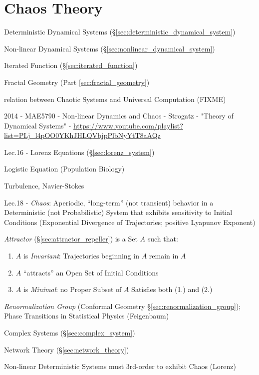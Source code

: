 \section{Chaos Theory}\label{sec:chaos_theory}

Deterministic Dynamical Systems (\S\ref{sec:deterministic_dynamical_system})

Non-linear Dynamical Systems (\S\ref{sec:nonlinear_dynamical_system})

Iterated Function (\S\ref{sec:iterated_function})

Fractal Geometry (Part \ref{sec:fractal_geometry})

relation between Chaotic Systems and Universal Computation (FIXME)

2014 - MAE5790 - Non-linear Dynamics and Chaos - Strogatz - "Theory of
Dynamical Systems" -
\url{https://www.youtube.com/playlist?list=PLj_l4pOO0YKhJHLQVbjpPlbNyYtT8aAQz}

Lec.16 - Lorenz Equations (\S\ref{sec:lorenz_system})

Logistic Equation (Population Biology)

Turbulence, Navier-Stokes

Lec.18 - \emph{Chaos}: Aperiodic, ``long-term'' (not transient) behavior in a
Deterministic (not Probabilistic) System that exhibits sensitivity to Initial
Conditions (Exponential Divergence of Trajectories; positive Lyapunov Exponent)

\emph{Attractor} (\S\ref{sec:attractor_repeller}) is a Set $A$ such that:
\begin{enumerate}
  \item $A$ is \emph{Invariant}: Trajectories beginning in $A$ remain in $A$
  \item $A$ ``attracts'' an Open Set of Initial Conditions
  \item $A$ is \emph{Minimal}: no Proper Subset of $A$ Satisfies both (1.) and
    (2.)
\end{enumerate}

\emph{Renormalization Group} (Conformal Geometry
\S\ref{sec:renormalization_group}); Phase Transitions in Statistical Physics
(Feigenbaum)

Complex Systems (\S\ref{sec:complex_system})

Network Theory (\S\ref{sec:network_theory})

Non-linear Deterministic Systems must 3rd-order to exhibit Chaos (Lorenz)

